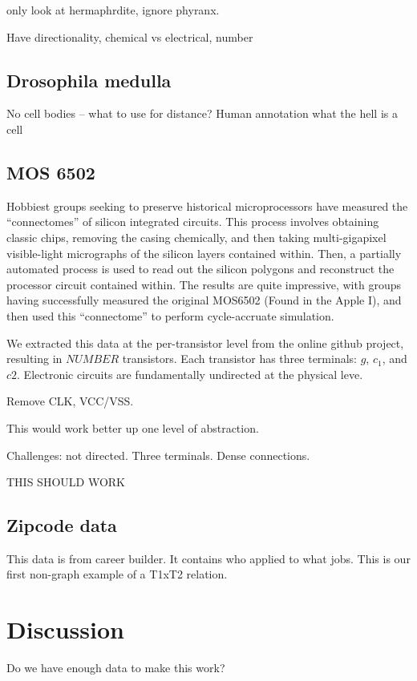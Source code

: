 \documentclass{article}
\begin{document}
only look at hermaphrdite, ignore phyranx. 

Have directionality, chemical vs electrical, number


\subsection{Drosophila medulla}
\cite{DrosophilaConnectome}
No cell bodies -- what to use for distance? 
Human annotation
what the hell is a cell

\subsection{MOS 6502}

Hobbiest groups seeking to preserve historical microprocessors have
measured the ``connectomes'' of silicon integrated circuits. This
process involves obtaining classic chips, removing the casing
chemically, and then taking multi-gigapixel visible-light micrographs
of the silicon layers contained within. Then, a partially automated
process is used to read out the silicon polygons and reconstruct the
processor circuit contained within. The results are quite impressive,
with groups having successfully measured the original MOS6502 (Found
in the Apple I), and then used this ``connectome'' to perform
cycle-accruate simulation.

We extracted this data at the per-transistor level from the online
github project, resulting in $NUMBER$ transistors. Each transistor has
three terminals: $g$, $c_1$, and $c2$. Electronic circuits are fundamentally
undirected at the physical leve. 

Remove CLK, VCC/VSS. 

This would work better up one level of abstraction. 


Challenges: not directed. Three terminals. Dense connections. 

THIS SHOULD WORK

\subsection{Zipcode data}

This data is from career builder. It contains who applied to what jobs. This is our first non-graph example of a T1xT2 relation. 



\section{Discussion}
Do we have enough data to make this work? 
\end{document}
